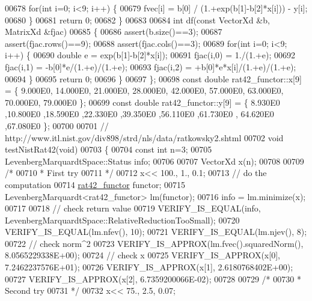 \begin{DoxyCode}
00678         \textcolor{keywordflow}{for}(\textcolor{keywordtype}{int} i=0; i<9; i++) \{
00679             fvec[i] = b[0] / (1.+exp(b[1]-b[2]*x[i])) - y[i];
00680         \}
00681         \textcolor{keywordflow}{return} 0;
00682     \}
00683 
00684     \textcolor{keywordtype}{int} df(\textcolor{keyword}{const} VectorXd &b, MatrixXd &fjac)
00685     \{
00686         assert(b.size()==3);
00687         assert(fjac.rows()==9);
00688         assert(fjac.cols()==3);
00689         \textcolor{keywordflow}{for}(\textcolor{keywordtype}{int} i=0; i<9; i++) \{
00690             \textcolor{keywordtype}{double} e = exp(b[1]-b[2]*x[i]);
00691             fjac(i,0) = 1./(1.+e);
00692             fjac(i,1) = -b[0]*e/(1.+e)/(1.+e);
00693             fjac(i,2) = +b[0]*e*x[i]/(1.+e)/(1.+e);
00694         \}
00695         \textcolor{keywordflow}{return} 0;
00696     \}
00697 \};
00698 \textcolor{keyword}{const} \textcolor{keywordtype}{double} rat42\_functor::x[9] = \{ 9.000E0, 14.000E0, 21.000E0, 28.000E0, 42.000E0, 57.000E0, 63.000E0, 
      70.000E0, 79.000E0 \};
00699 \textcolor{keyword}{const} \textcolor{keywordtype}{double} rat42\_functor::y[9] = \{ 8.930E0 ,10.800E0 ,18.590E0 ,22.330E0 ,39.350E0 ,56.110E0 ,61.730E0 ,
      64.620E0 ,67.080E0 \};
00700 
00701 \textcolor{comment}{// http://www.itl.nist.gov/div898/strd/nls/data/ratkowsky2.shtml}
00702 \textcolor{keywordtype}{void} testNistRat42(\textcolor{keywordtype}{void})
00703 \{
00704   \textcolor{keyword}{const} \textcolor{keywordtype}{int} n=3;
00705   LevenbergMarquardtSpace::Status info;
00706 
00707   VectorXd x(n);
00708 
00709   \textcolor{comment}{/*}
00710 \textcolor{comment}{   * First try}
00711 \textcolor{comment}{   */}
00712   x<< 100., 1., 0.1;
00713   \textcolor{comment}{// do the computation}
00714   \hyperlink{structrat42__functor}{rat42\_functor} functor;
00715   LevenbergMarquardt<rat42\_functor> lm(functor);
00716   info = lm.minimize(x);
00717 
00718   \textcolor{comment}{// check return value}
00719   VERIFY\_IS\_EQUAL(info, LevenbergMarquardtSpace::RelativeReductionTooSmall);
00720   VERIFY\_IS\_EQUAL(lm.nfev(), 10);
00721   VERIFY\_IS\_EQUAL(lm.njev(), 8);
00722   \textcolor{comment}{// check norm^2}
00723   VERIFY\_IS\_APPROX(lm.fvec().squaredNorm(), 8.0565229338E+00);
00724   \textcolor{comment}{// check x}
00725   VERIFY\_IS\_APPROX(x[0], 7.2462237576E+01);
00726   VERIFY\_IS\_APPROX(x[1], 2.6180768402E+00);
00727   VERIFY\_IS\_APPROX(x[2], 6.7359200066E-02);
00728 
00729   \textcolor{comment}{/*}
00730 \textcolor{comment}{   * Second try}
00731 \textcolor{comment}{   */}
00732   x<< 75., 2.5, 0.07;

\end{DoxyCode}
